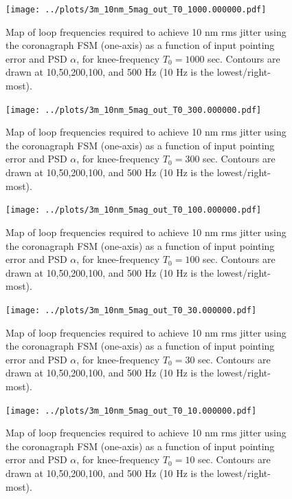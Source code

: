 \documentclass[10pt,preprint]{aastex631}
\begin{document}
\begin{figure}[h!]
\centering
\texttt{[image: ../plots/3m\_10nm\_5mag\_out\_T0\_1000.000000.pdf]}
\caption{Map of loop frequencies required to achieve 10 nm rms jitter using the coronagraph FSM (one-axis) as a function of input pointing error and PSD $\alpha$, for knee-frequency $T_0 = 1000$ sec.  Contours are drawn at 10,50,200,100, and 500 Hz (10 Hz is the lowest/right-most).  \label{fig:s2_T0-1000}}
\end{figure}

\begin{figure}[h!]
\centering
\texttt{[image: ../plots/3m\_10nm\_5mag\_out\_T0\_300.000000.pdf]}
\caption{Map of loop frequencies required to achieve 10 nm rms jitter using the coronagraph FSM (one-axis) as a function of input pointing error and PSD $\alpha$, for knee-frequency $T_0 = 300$ sec.  Contours are drawn at 10,50,200,100, and 500 Hz (10 Hz is the lowest/right-most).  \label{fig:s2_T0-300}}
\end{figure}

\begin{figure}[h!]
\centering
\texttt{[image: ../plots/3m\_10nm\_5mag\_out\_T0\_100.000000.pdf]}
\caption{Map of loop frequencies required to achieve 10 nm rms jitter using the coronagraph FSM (one-axis) as a function of input pointing error and PSD $\alpha$, for knee-frequency $T_0 = 100$ sec.  Contours are drawn at 10,50,200,100, and 500 Hz (10 Hz is the lowest/right-most).  \label{fig:s2_T0-100}}
\end{figure}

\begin{figure}[h!]
\centering
\texttt{[image: ../plots/3m\_10nm\_5mag\_out\_T0\_30.000000.pdf]}
\caption{Map of loop frequencies required to achieve 10 nm rms jitter using the coronagraph FSM (one-axis) as a function of input pointing error and PSD $\alpha$, for knee-frequency $T_0 = 30$ sec.  Contours are drawn at 10,50,200,100, and 500 Hz (10 Hz is the lowest/right-most).  \label{fig:s2_T0-30}}
\end{figure}

\begin{figure}[h!]
\centering
\texttt{[image: ../plots/3m\_10nm\_5mag\_out\_T0\_10.000000.pdf]}
\caption{Map of loop frequencies required to achieve 10 nm rms jitter using the coronagraph FSM (one-axis) as a function of input pointing error and PSD $\alpha$, for knee-frequency $T_0 = 10$ sec.  Contours are drawn at 10,50,200,100, and 500 Hz (10 Hz is the lowest/right-most).  \label{fig:s2_T0-10}}
\end{figure}
\end{document}
